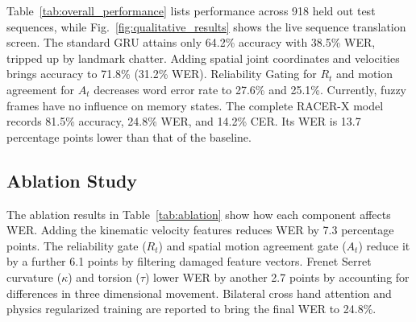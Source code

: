 \documentclass[conference]{IEEEtran}
\begin{document}
Table~\ref{tab:overall_performance} lists performance across 918 held out test sequences, while Fig.~\ref{fig:qualitative_results} shows the live sequence translation screen. The standard GRU attains only 64.2\% accuracy with 38.5\% WER, tripped up by landmark chatter. Adding spatial joint coordinates and velocities brings accuracy to 71.8\% (31.2\% WER). Reliability Gating for $R_t$ and motion agreement for $A_t$ decreases word error rate to 27.6\% and 25.1\%. Currently, fuzzy frames have no influence on memory states. The complete RACER-X model records 81.5\% accuracy, 24.8\% WER, and 14.2\% CER. Its WER is 13.7 percentage points lower than that of the baseline.

\subsection{Ablation Study}
\vspace{-1.5mm}

\begin{table}[H]
\centering
\caption{Ablation of RACER-X Components}
\label{tab:ablation}
\end{table}
\vspace{-1mm}

The ablation results in Table~\ref{tab:ablation} show how each component affects WER. Adding the kinematic velocity features reduces WER by 7.3 percentage points. The reliability gate ($R_t$) and spatial motion agreement gate ($A_t$) reduce it by a further 6.1 points by filtering damaged feature vectors. Frenet Serret curvature ($\kappa$) and torsion ($\tau$) lower WER by another 2.7 points by accounting for differences in three dimensional movement. Bilateral cross hand attention and physics regularized training are reported to bring the final WER to 24.8\%.
\end{document}
